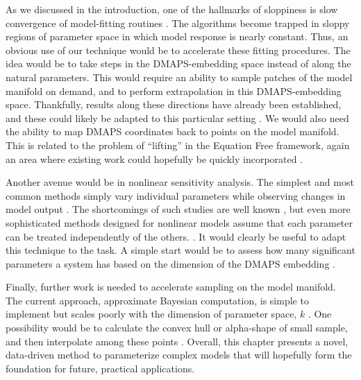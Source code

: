 As we discussed in the introduction, one of the hallmarks of
sloppiness is slow convergence of model-fitting routines
\cite{transtrum_geometry_2011}. The algorithms become trapped in
sloppy regions of parameter space in which model response is nearly
constant. Thus, an obvious use of our technique would be to accelerate
these fitting procedures. The idea would be to take steps in the
DMAPS-embedding space instead of along the natural parameters. This
would require an ability to sample patches of the model manifold on
demand, and to perform extrapolation in this DMAPS-embedding
space. Thankfully, results along these directions have already been
established, and these could likely be adapted to this particular
setting \cite{chiavazzo_intrinsic_2017}. We would also need the
ability to map DMAPS coordinates back to points on the model
manifold. This is related to the problem of ``lifting'' in the
Equation Free framework, again an area where existing work could
hopefully be quickly incorporated
\cite{rajendran_data_2016,laing_equation-free_2015,laing_coarse-grained_2007}.

Another avenue would be in nonlinear sensitivity analysis. The
simplest and most common methods simply vary individual parameters
while observing changes in model output
\cite{murphy_quantification_2004}. The shortcomings of such studies
are well known \cite{How to avoid a perfunctory sensitivity analysis},
but even more sophisticated methods designed for nonlinear models
assume that each parameter can be treated independently of the
others. \cite{cukier_nonlinear_1978}. It would clearly be useful to
adapt this technique to the task. A simple start would be to assess
how many significant parameters a system has based on the dimension of
the DMAPS embedding \cite{dsilva_parsimonious_2015}.

Finally, further work is needed to accelerate sampling on the model
manifold. The current approach, approximate Bayesian computation, is
simple to implement but scales poorly with the dimension of parameter
space, $k$ \cite{turner_tutorial_2012}. One possibility would be to
calculate the convex hull or alpha-shape of small sample, and then
interpolate among these points
\cite{barber_quickhull_1996,edelsbrunner_three-dimensional_1994}. Overall,
this chapter presents a novel, data-driven method to parameterize
complex models that will hopefully form the foundation for future,
practical applications.



